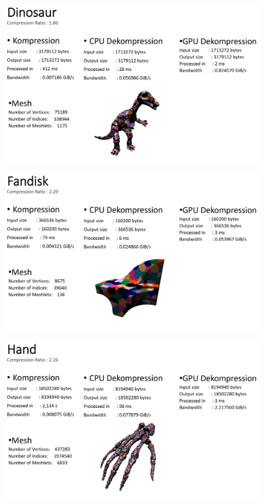 \begin{figure}[h]
  \centering  
  \includegraphics[scale=0.28]{Bilder/ergebnisse_full/dinosaur.png}
\end{figure}
\begin{figure}[h]
  \centering  
  \includegraphics[scale=0.28]{Bilder/ergebnisse_full/fandisk.png}
\end{figure}
\begin{figure}[h]
  \centering  
  \includegraphics[scale=0.28]{Bilder/ergebnisse_full/hand.png}
\end{figure}
